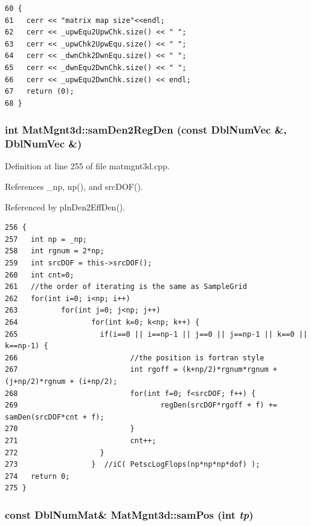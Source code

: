 \footnotesize\begin{verbatim}60 {
61   cerr << "matrix map size"<<endl;
62   cerr << _upwEqu2UpwChk.size() << " ";
63   cerr << _upwChk2UpwEqu.size() << " ";
64   cerr << _dwnChk2DwnEqu.size() << " ";
65   cerr << _dwnEqu2DwnChk.size() << " ";
66   cerr << _upwEqu2DwnChk.size() << endl;
67   return (0);
68 }
\end{verbatim}\normalsize 


\subsubsection{\setlength{\rightskip}{0pt plus 5cm}int Mat\-Mgnt3d::sam\-Den2Reg\-Den (const Dbl\-Num\-Vec \&, Dbl\-Num\-Vec \&)}\label{classMatMgnt3d_fa20d80fbb117bd78c6bad8de4964df7_fa20d80fbb117bd78c6bad8de4964df7}




Definition at line 255 of file matmgnt3d.cpp.

References \_\-np, np(), and src\-DOF().

Referenced by pln\-Den2Eff\-Den().

\footnotesize\begin{verbatim}256 {
257   int np = _np;
258   int rgnum = 2*np;
259   int srcDOF = this->srcDOF();
260   int cnt=0;
261   //the order of iterating is the same as SampleGrid
262   for(int i=0; i<np; i++)
263          for(int j=0; j<np; j++)
264                 for(int k=0; k<np; k++) {
265                   if(i==0 || i==np-1 || j==0 || j==np-1 || k==0 || k==np-1) {
266                          //the position is fortran style
267                          int rgoff = (k+np/2)*rgnum*rgnum + (j+np/2)*rgnum + (i+np/2);
268                          for(int f=0; f<srcDOF; f++) {
269                                 regDen(srcDOF*rgoff + f) += samDen(srcDOF*cnt + f);
270                          }
271                          cnt++;
272                   }
273                 }  //iC( PetscLogFlops(np*np*np*dof) );
274   return 0;
275 }
\end{verbatim}\normalsize 


\subsubsection{\setlength{\rightskip}{0pt plus 5cm}const Dbl\-Num\-Mat\& Mat\-Mgnt3d::sam\-Pos (int {\em tp})\hspace{0.3cm}{\tt  [inline]}}\label{classMatMgnt3d_86bc928d5146f28060644f8132bfbadd_86bc928d5146f28060644f8132bfbadd}


